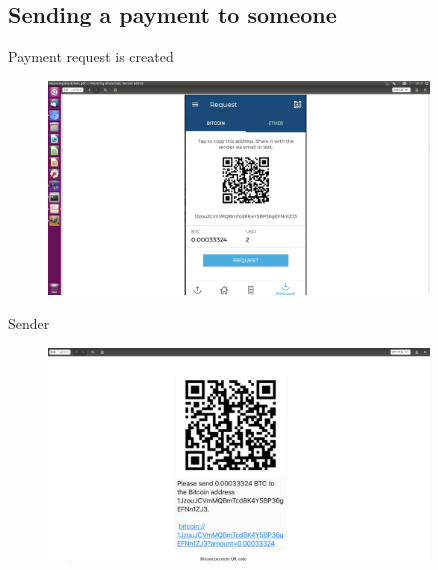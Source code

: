 \documentclass[serif]{beamer}
\begin{document}
\subsection{Sending a payment to someone}
\begin{frame}{Payment request is created}
		\begin{figure}
			\includegraphics[width=0.9\textwidth]{request}
			\label{fig:request}
		\end{figure}
\end{frame}
\begin{frame}{Sender}
	\begin{figure}
		\includegraphics[width=0.9\textwidth]{sender}
		\label{fig:request2}
	\end{figure}
	
\end{frame}
\end{document}
